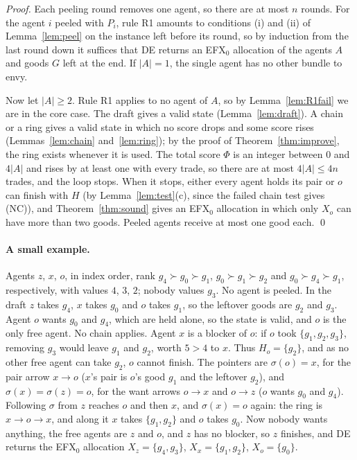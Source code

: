 \documentclass[runningheads,11pt]{llncs}
\newcommand{\efxz}{\texorpdfstring{\mbox{EFX$_0$}}{EFX0}}
\newcommand{\DE}{\textup{DE}}
\begin{document}
\begin{proof}
Each peeling round removes one agent, so there are at most $n$ rounds. For the agent $i$ peeled with $P_i$, rule R1 amounts to conditions (i) and (ii) of Lemma~\ref{lem:peel} on the instance left before its round, so by induction from the last round down it suffices that \DE{} returns an \efxz{} allocation of the agents $A$ and goods $G$ left at the end. If $|A|=1$, the single agent has no other bundle to envy.

Now let $|A|\ge2$. Rule R1 applies to no agent of $A$, so by Lemma~\ref{lem:R1fail} we are in the core case. The draft gives a valid state (Lemma~\ref{lem:draft}). A chain or a ring gives a valid state in which no score drops and some score rises (Lemmas~\ref{lem:chain} and~\ref{lem:ring}); by the proof of Theorem~\ref{thm:improve}, the ring exists whenever it is used. The total score $\Phi$ is an integer between $0$ and $4|A|$ and rises by at least one with every trade, so there are at most $4|A|\le4n$ trades, and the loop stops. When it stops, either every agent holds its pair or $o$ can finish with $H$ (by Lemma~\ref{lem:test}(c), since the failed chain test gives (NC)), and Theorem~\ref{thm:sound} gives an \efxz{} allocation in which only $X_o$ can have more than two goods. Peeled agents receive at most one good each. \qed
\end{proof}

\paragraph{A small example.} Agents $z$, $x$, $o$, in index order, rank $g_4\succ g_0\succ g_1$, $g_0\succ g_1\succ g_2$ and $g_0\succ g_4\succ g_1$, respectively, with values $4$, $3$, $2$; nobody values $g_3$. No agent is peeled. In the draft $z$ takes $g_4$, $x$ takes $g_0$ and $o$ takes $g_1$, so the leftover goods are $g_2$ and $g_3$. Agent $o$ wants $g_0$ and $g_4$, which are held alone, so the state is valid, and $o$ is the only free agent. No chain applies. Agent $x$ is a blocker of $o$: if $o$ took $\{g_1,g_2,g_3\}$, removing $g_3$ would leave $g_1$ and $g_2$, worth $5>4$ to $x$. Thus $H_o=\{g_2\}$, and as no other free agent can take $g_2$, $o$ cannot finish. The pointers are $\sigma(o)=x$, for the pair arrow $x\to o$ ($x$'s pair is $o$'s good $g_1$ and the leftover $g_2$), and $\sigma(x)=\sigma(z)=o$, for the want arrows $o\to x$ and $o\to z$ ($o$ wants $g_0$ and $g_4$). Following $\sigma$ from $z$ reaches $o$ and then $x$, and $\sigma(x)=o$ again: the ring is $x\to o\to x$, and along it $x$ takes $\{g_1,g_2\}$ and $o$ takes $g_0$. Now nobody wants anything, the free agents are $z$ and $o$, and $z$ has no blocker, so $z$ finishes, and \DE{} returns the \efxz{} allocation $X_z=\{g_4,g_3\}$, $X_x=\{g_1,g_2\}$, $X_o=\{g_0\}$.
\end{document}
